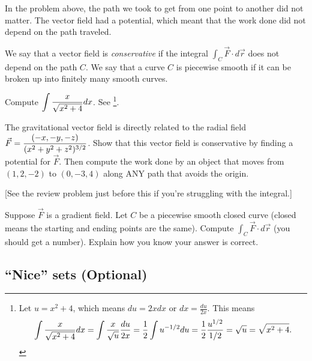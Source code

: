 In the problem above, the path we took to get from one point to another did not matter. The vector field had a potential, which meant that the work done did not depend on the path traveled. 
\begin{definition}
 We say that a vector field is \emph{conservative} if the integral $\int_C \vec F\cdot d\vec r$ does not depend on the path $C$. We say that a curve $C$ is piecewise smooth if it can be broken up into finitely many smooth curves.
\end{definition}
 
\begin{review*}
 Compute $\displaystyle \int \frac{x}{\sqrt{x^2+4}}dx$. See \footnote{
Let $u=x^2+4$, which means $du=2xdx$ or $dx=\frac{du}{2x}$.  This means
$$\displaystyle \int \frac{x}{\sqrt{x^2+4}}dx 
= \int \frac{x}{\sqrt{u}}\frac{du}{2x} 
= \frac{1}{2}\int u^{-1/2}du
= \frac{1}{2}\frac{u^{1/2}}{1/2}
= \sqrt{u} = \sqrt{x^2+4}.
$$
}.
\end{review*}


\begin{problem}
 The gravitational vector field is directly related to the radial field $\displaystyle\vec F = \frac{\left(-x,-y,-z\right)}{(x^2+y^2+z^2)^{3/2}}$. Show that this vector field is conservative by finding a potential for $\vec F$.  Then compute the work done by an object that moves from $(1,2,-2)$ to $(0,-3,4)$ along ANY path that avoids the origin. 

[See the review problem just before this if you're struggling with the integral.]
\end{problem}


\begin{problem}
 Suppose $\vec F$ is a gradient field.  Let $C$ be a piecewise smooth closed curve (closed means the starting and ending points are the same). Compute $\int_C \vec F\cdot d\vec r$ (you should get a number). Explain how you know your answer is correct.
\end{problem}


\subsection{``Nice'' sets (Optional)}
\label{sec:nice-sets}



